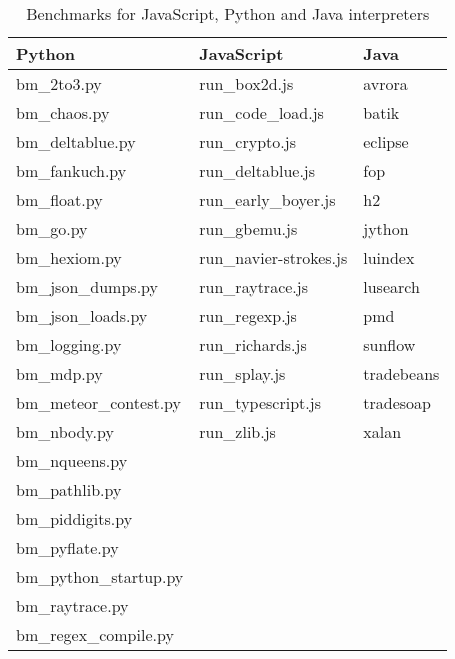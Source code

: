 \documentclass[parskip=full, paper=a4, fontsize=12pt]{scrartcl}
\numberwithin{equation}{section}
\numberwithin{figure}{section}
\numberwithin{table}{section}
\begin{document}
\begin{table}
\centering
    \begin{tabular}{|l|l|l|}
        \hline
        \textbf{Python}         &\textbf{JavaScript}        &\textbf{Java} \\
        \hline
        bm\_2to3.py             &run\_box2d.js              &avrora     \\
        bm\_chaos.py            &run\_code\_load.js         &batik      \\
        bm\_deltablue.py        &run\_crypto.js             &eclipse    \\
        bm\_fankuch.py          &run\_deltablue.js          &fop        \\
        bm\_float.py            &run\_early\_boyer.js       &h2         \\
        bm\_go.py               &run\_gbemu.js              &jython     \\
        bm\_hexiom.py           &run\_navier-strokes.js     &luindex    \\
        bm\_json\_dumps.py      &run\_raytrace.js           &lusearch   \\
        bm\_json\_loads.py      &run\_regexp.js             &pmd        \\
        bm\_logging.py          &run\_richards.js           &sunflow    \\
        bm\_mdp.py              &run\_splay.js              &tradebeans \\
        bm\_meteor\_contest.py  &run\_typescript.js         &tradesoap  \\
        bm\_nbody.py            &run\_zlib.js               &xalan      \\
        bm\_nqueens.py          &                           &           \\
        bm\_pathlib.py          &                           &           \\
        bm\_piddigits.py        &                           &           \\
        bm\_pyflate.py          &                           &           \\
        bm\_python\_startup.py  &                           &           \\
        bm\_raytrace.py         &                           &           \\
        bm\_regex\_compile.py   &                           &           \\
        \hline
    \end{tabular}
    \caption{Benchmarks for JavaScript, Python and Java interpreters}
    \label{tab:benchmarks}
\end{table}
\end{document}
